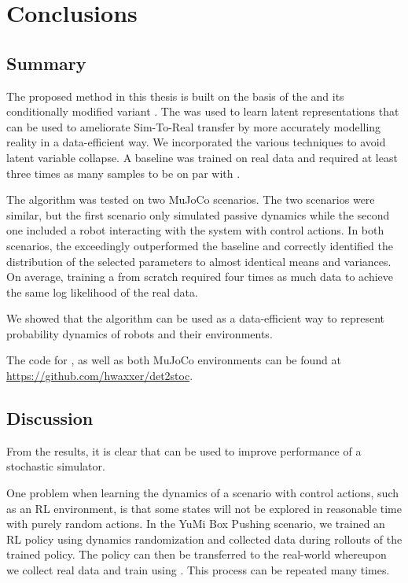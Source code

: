 \chapter{Conclusions}
\label{conclusions}

\section{Summary}

The proposed method in this thesis is built on the basis of the \vae{} and its conditionally modified variant \cvae{}. The \cvae{} was used to learn latent representations that can be used to ameliorate Sim-To-Real transfer by more accurately modelling reality in a data-efficient way. We incorporated the various techniques to avoid latent variable collapse. A baseline \cvae{} was trained on real data and required at least three times as many samples to be on par with \dettostoc{}.

The \dettostoc{} algorithm was tested on two MuJoCo scenarios. The two scenarios were similar, but the first scenario only simulated passive dynamics while the second one included a robot interacting with the system with control actions. In both scenarios, the \dettostoc{} exceedingly outperformed the baseline and correctly identified the distribution of the selected parameters to almost identical means and variances. On average, training a \cvae{} from scratch required four times as much data to achieve the same log likelihood of the real data.

We showed that the \dettostoc{} algorithm can be used as a data-efficient way to represent probability dynamics of robots and their environments.

The code for \dettostoc{}, as well as both MuJoCo environments can be found at \url{https://github.com/hwaxxer/det2stoc}. 

\section{Discussion}

From the results, it is clear that \dettostoc{} can be used to improve performance of a stochastic simulator. 

One problem when learning the dynamics of a scenario with control actions, such as an RL environment, is that some states will not be explored in reasonable time with purely random actions. In the YuMi Box Pushing scenario, we trained an RL policy using dynamics randomization and collected data during rollouts of the trained policy. The policy can then be transferred to the real-world whereupon we collect real data and train using \dettostoc{}. This process can be repeated many times.

